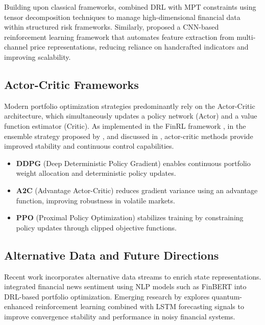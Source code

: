 \documentclass[final]{article}
\begin{document}
Building upon classical frameworks, \citet{jang2023deep} combined DRL with MPT constraints using tensor decomposition techniques to manage high-dimensional financial data within structured risk frameworks. Similarly, \citet{jiang2017deep} proposed a CNN-based reinforcement learning framework that automates feature extraction from multi-channel price representations, reducing reliance on handcrafted indicators and improving scalability.

\subsection{Actor-Critic Frameworks}

Modern portfolio optimization strategies predominantly rely on the Actor-Critic architecture, which simultaneously updates a policy network (Actor) and a value function estimator (Critic). As implemented in the FinRL framework \citep{liu2020finrl}, in the ensemble strategy proposed by \citet{yang2025ensemble}, and discussed in \citet{jang2023deep}, actor-critic methods provide improved stability and continuous control capabilities.

\begin{itemize}
    \item \textbf{DDPG} (Deep Deterministic Policy Gradient) enables continuous portfolio weight allocation and deterministic policy updates.
    \item \textbf{A2C} (Advantage Actor-Critic) reduces gradient variance using an advantage function, improving robustness in volatile markets.
    \item \textbf{PPO} (Proximal Policy Optimization) stabilizes training by constraining policy updates through clipped objective functions.
\end{itemize}

\subsection{Alternative Data and Future Directions}

Recent work incorporates alternative data streams to enrich state representations. \citet{nawathe2024multimodal} integrated financial news sentiment using NLP models such as FinBERT into DRL-based portfolio optimization. Emerging research by \citet{liu2025quantum} explores quantum-enhanced reinforcement learning combined with LSTM forecasting signals to improve convergence stability and performance in noisy financial systems.
\end{document}
